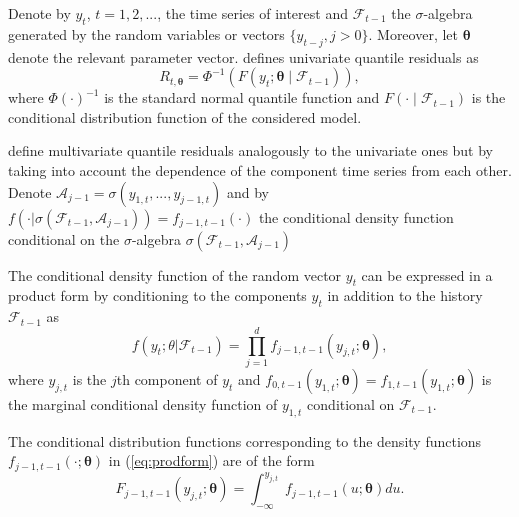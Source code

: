 \documentclass[nojss]{jss} %
\begin{document}
Denote by $y_t$, $t=1,2,...$,  the time series of interest and $\mathcal{F}_{t-1}$ the $\sigma$-algebra generated by the random variables or vectors $\lbrace y_{t-j}, j > 0 \rbrace$.  Moreover, let $\boldsymbol{\theta}$ denote the relevant parameter vector. \cite{Kalliovirta:2012} defines univariate quantile residuals as
\begin{equation}
R_{t,\boldsymbol{\theta}}=\Phi^{-1}(F(y_t;\boldsymbol{\theta}\mid \mathcal{F}_{t-1})),
\end{equation}
where $\Phi(\cdot)^{-1}$ is the standard normal quantile function and $F(\cdot\mid \mathcal{F}_{t-1})$ is the conditional distribution function of the considered model.

\cite{Kalliovirta+Saikkonen:2010} define multivariate quantile residuals analogously to the univariate ones but by taking into account the dependence of the component time series from each other.  Denote $\mathcal{A}_{j-1}=\sigma(y_{1,t},...,y_{j-1,t})$ and by $f(\cdot|\sigma(\mathcal{F}_{t-1},\mathcal{A}_{j-1}))=f_{j-1,t-1}(\cdot)$ the conditional density function conditional on the $\sigma$-algebra $\sigma(\mathcal{F}_{t-1},\mathcal{A}_{j-1})$

The conditional density function of the random vector $y_t$ can be expressed in a product form by conditioning to the components $y_t$ in addition to the history $\mathcal{F}_{t-1}$ as
\begin{equation}\label{eq:prodform}
f(y_t;\theta|\mathcal{F}_{t-1})=\prod_{j=1}^{d}f_{j-1,t-1}(y_{j,t};\boldsymbol{\theta}),
\end{equation}
where $y_{j,t}$ is the $j$th component of $y_t$ and $f_{0,t-1}(y_{1,t};\boldsymbol{\theta})=f_{1,t-1}(y_{1,t};\boldsymbol{\theta})$ is the marginal conditional density function of $y_{1,t}$ conditional on $\mathcal{F}_{t-1}$.

The conditional distribution functions corresponding to the density functions $f_{j-1,t-1}(\cdot;\boldsymbol{\theta})$ in (\ref{eq:prodform}) are of the form
\begin{equation}
F_{j-1,t-1}(y_{j,t};\boldsymbol{\theta})=\int_{-\infty}^{y_{j,t}} f_{j-1,t-1}(u;\boldsymbol{\theta})du.
\end{equation}
\end{document}
